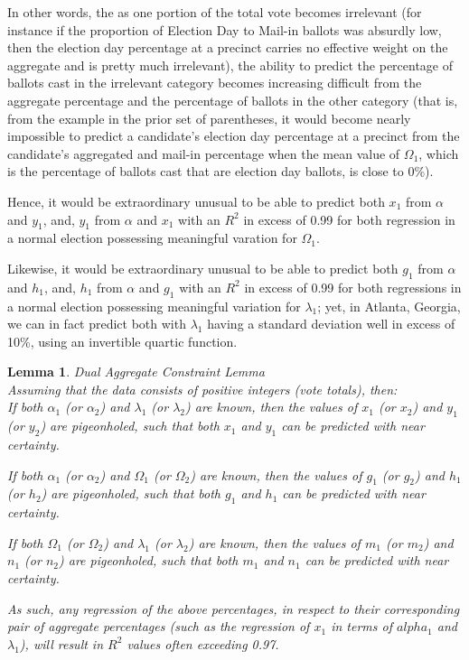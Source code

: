 \documentclass[preprint,13pt]{elsarticle}
\newtheorem{lemma}[theorem]{Lemma}
\begin{document}
In other words, the as one portion of the total vote becomes irrelevant (for instance if the proportion of Election Day to Mail-in ballots was absurdly low, then the election day percentage at a precinct carries no effective weight on the aggregate and is pretty much irrelevant), the ability to predict the percentage of ballots cast in the irrelevant category becomes increasing difficult from the aggregate percentage and the percentage of ballots in the other category (that is, from the example in the prior set of parentheses, it would become nearly impossible to predict a candidate's election day percentage at a precinct from the candidate's aggregated and mail-in percentage when the mean value of $\Omega_{1}$, which is the percentage of ballots cast that are election day ballots, is close to 0\%).

Hence, it would be extraordinary unusual to be able to predict both $x_{1}$ from $\alpha$ and $y_{1}$, and, $y_{1}$ from $\alpha$ and $x_{1}$ with an $R^2$ in excess of 0.99 for both regression in a normal election possessing meaningful varation for $\Omega_{1}$.

Likewise, it would be extraordinary unusual to be able to predict both $g_{1}$ from $\alpha$ and $h_{1}$, and, $h_{1}$ from $\alpha$ and $g_{1}$ with an $R^2$ in excess of 0.99 for both regressions in a normal election possessing meaningful variation for $\lambda_{1}$; yet, in Atlanta, Georgia, we can in fact predict both with $\lambda_{1}$ having a standard deviation well in excess of 10\%, using an invertible quartic function.
\newpage
\begin{lemma}{Dual Aggregate Constraint Lemma}\\
Assuming that the data consists of positive integers (vote totals), then:\\

If both $\alpha_{1}$ (or $\alpha_{2}$) and $\lambda_{1}$ (or $\lambda_{2}$) are known, then the values of $x_{1}$ (or $x_{2}$) and $y_{1}$ (or $y_{2}$) are pigeonholed, such that both $x_{1}$ and $y_{1}$ can be predicted with near certainty.

If both $\alpha_{1}$ (or $\alpha_{2}$) and $\Omega_{1}$ (or $\Omega_{2}$) are known, then the values of $g_{1}$ (or $g_{2}$) and $h_{1}$ (or $h_{2}$) are pigeonholed, such that both $g_{1}$ and $h_{1}$ can be predicted with near certainty.

If both $\Omega_{1}$ (or $\Omega_{2}$) and $\lambda_{1}$ (or $\lambda_{2}$) are known, then the values of $m_{1}$ (or $m_{2}$) and $n_{1}$ (or $n_{2}$) are pigeonholed, such that both $m_{1}$ and $n_{1}$ can be predicted with near certainty.

As such, any regression of the above percentages, in respect to their corresponding pair of aggregate percentages (such as the regression of $x_{1}$ in terms of $alpha_{1}$ and $\lambda_{1}$), will result in $R^2$ values often exceeding 0.97.
\end{lemma}
\end{document}
